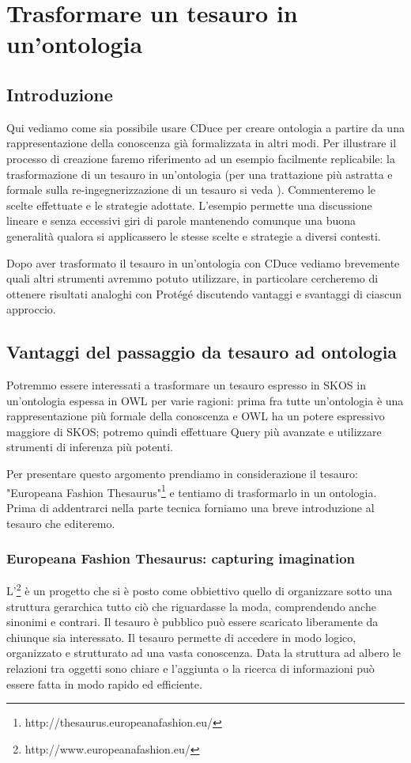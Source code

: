 \chapter{Trasformare un tesauro in un'ontologia}\label{ch3}
\section*{Introduzione}
Qui vediamo come sia possibile usare CDuce per creare ontologia a partire da una rappresentazione della conoscenza già formalizzata in altri modi. Per illustrare il processo di creazione faremo riferimento ad un esempio facilmente replicabile: la trasformazione di un tesauro in un'ontologia (per una trattazione più astratta e formale sulla re-ingegnerizzazione di un tesauro si veda \cite{re_engineeringThesaurus}). Commenteremo le scelte effettuate e le strategie adottate. L'esempio permette una discussione lineare e senza eccessivi giri di parole mantenendo comunque una buona generalità qualora si applicassero le stesse scelte e strategie a diversi contesti.

Dopo aver trasformato il tesauro in un'ontologia con CDuce vediamo brevemente quali altri strumenti avremmo potuto utilizzare, in particolare cercheremo di ottenere risultati analoghi con Protégé discutendo vantaggi e svantaggi di ciascun approccio.

\section{Vantaggi del passaggio da tesauro ad ontologia}
Potremmo essere interessati a trasformare un tesauro espresso in SKOS in un'ontologia espessa in OWL per varie ragioni: prima fra tutte un'ontologia è una rappresentazione più formale della conoscenza e OWL ha un potere espressivo maggiore di SKOS; potremo quindi effettuare Query più avanzate e utilizzare strumenti di inferenza più potenti.

Per presentare questo argomento prendiamo in considerazione il tesauro: "Europeana Fashion Thesaurus"\footnote{http://thesaurus.europeanafashion.eu/} e tentiamo di trasformarlo in un ontologia. Prima di addentrarci nella parte tecnica forniamo una breve introduzione al tesauro che editeremo.
\subsection{Europeana Fashion Thesaurus: capturing imagination}
L'\footnote{http://www.europeanafashion.eu/} è un progetto che si è posto come obbiettivo quello di organizzare sotto una struttura gerarchica tutto ciò che riguardasse la moda, comprendendo anche sinonimi e contrari. Il tesauro è pubblico può essere scaricato liberamente da chiunque sia interessato. Il tesauro permette di accedere in modo logico, organizzato e strutturato ad una vasta conoscenza. Data la struttura ad albero le relazioni tra oggetti sono chiare e l'aggiunta o la ricerca di informazioni può essere fatta in modo rapido ed efficiente.
